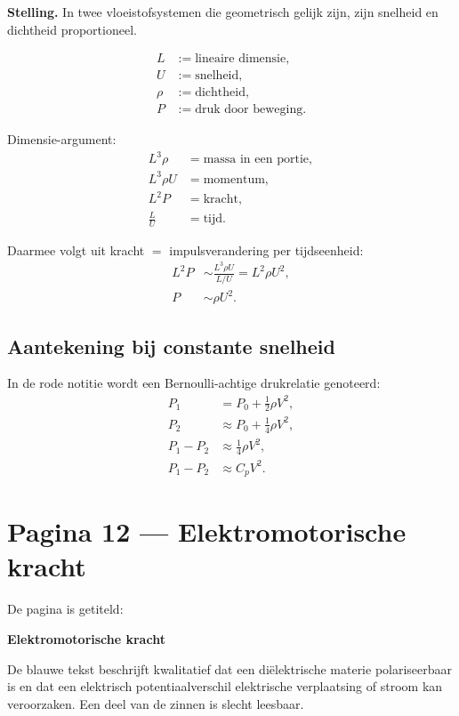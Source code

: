 \documentclass[11pt]{article}
\begin{document}
\textbf{Stelling.}
In twee vloeistofsystemen die geometrisch gelijk zijn, zijn snelheid en dichtheid proportioneel.

\begin{align*}
L &:= \text{lineaire dimensie},\\
U &:= \text{snelheid},\\
\rho &:= \text{dichtheid},\\
P &:= \text{druk door beweging}.
\end{align*}

Dimensie-argument:
\begin{align*}
L^3\rho
  &= \text{massa in een portie},\\
L^3\rho U
  &= \text{momentum},\\
L^2P
  &= \text{kracht},\\
\frac{L}{U}
  &= \text{tijd}.
\end{align*}

Daarmee volgt uit kracht $=$ impulsverandering per tijdseenheid:
\begin{align*}
L^2P
  &\sim
  \frac{L^3\rho U}{L/U}
   =
  L^2\rho U^2,\\
P
  &\sim
  \rho U^2.
\end{align*}

\subsection*{Aantekening bij constante snelheid}

In de rode notitie wordt een Bernoulli-achtige drukrelatie genoteerd:
\begin{align*}
P_1 &= P_0+\frac{1}{2}\rho V^2,\\
P_2 &\approx P_0+\frac{1}{4}\rho V^2,\\
P_1-P_2 &\approx \frac{1}{4}\rho V^2,\\
P_1-P_2 &\approx C_pV^2.
\end{align*}

\section*{Pagina 12 --- Elektromotorische kracht}

De pagina is getiteld:
\begin{center}
\textbf{Elektromotorische kracht}
\end{center}

De blauwe tekst beschrijft kwalitatief dat een diëlektrische materie polariseerbaar is en dat een elektrisch potentiaalverschil elektrische verplaatsing of stroom kan veroorzaken. Een deel van de zinnen is slecht leesbaar.
\end{document}
